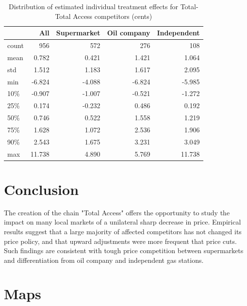 \documentclass[11pt]{article}
\begin{document}
\begin{table}[h]
\centering
\caption{Distribution of estimated individual treatment effects for Total-Total Access competitors (cents)}
\begin{tabular}{lrrrr}
\toprule
{} &     All &    Supermarket &    Oil company &     Independent \\
\midrule
count & 956 & 572 & 276 & 108 \\
mean  &   0.782 &   0.421 &   1.421 &   1.064 \\
std   &   1.512 &   1.183 &   1.617 &   2.095 \\
min   &  -6.824 &  -4.088 &  -6.824 &  -5.985 \\
10\%   &  -0.907 &  -1.007 &  -0.521 &  -1.272 \\
25\%   &   0.174 &  -0.232 &   0.486 &   0.192 \\
50\%   &   0.746 &   0.522 &   1.558 &   1.219 \\
75\%   &   1.628 &   1.072 &   2.536 &   1.906 \\
90\%   &   2.543 &   1.675 &   3.231 &   3.049 \\
max   &  11.738 &   4.890 &   5.769 &  11.738 \\
\bottomrule
\end{tabular}
\label{table:ta_fe_indiv_tta}
\end{table}

\clearpage

\section{Conclusion}

The creation of the chain "Total Access" offers the opportunity to study the impact on many local markets of a unilateral sharp decrease in price. Empirical results suggest that a large majority of affected competitors has not changed its price policy, and that upward adjustments were more frequent that price cuts. Such findings are consistent with tough price competition between supermarkets and differentiation from oil company and independent gas stations.

\clearpage



\newpage

\appendix

\section{Maps}
\end{document}

